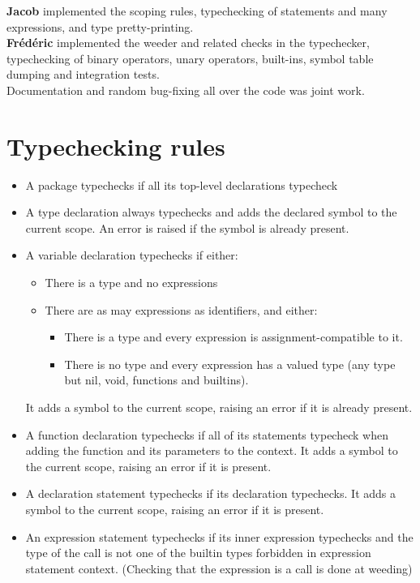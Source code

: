 \documentclass[letterpaper,11pt]{article}
\begin{document}
\textbf{Jacob} implemented the scoping rules, typechecking of statements and many expressions, and type pretty-printing.
\\
\textbf{Fr\'ed\'eric} implemented the weeder and related checks in the typechecker, typechecking of binary operators, unary operators, built-ins, symbol table dumping and integration tests.
\\
Documentation and random bug-fixing all over the code was joint work.

\section{Typechecking rules}

\begin{itemize}
\item A package typechecks if all its top-level declarations typecheck
\item A type declaration always typechecks and adds the declared symbol to the current scope. An error is raised if the symbol is already present.
\item A variable declaration typechecks if either:
	\begin{itemize}
	\item There is a type and no expressions
	\item There are as may expressions as identifiers, and either:
		\begin{itemize}
		\item There is a type and every expression is assignment-compatible to it.
		\item There is no type and every expression has a valued type (any type but nil, void, functions and builtins).
		\end{itemize}
	\end{itemize}
	It adds a symbol to the current scope, raising an error if it is already present.
\item A function declaration typechecks if all of its statements typecheck when adding the function and its parameters to the context. It adds a symbol to the current scope, raising an error if it is present.
\item A declaration statement typechecks if its declaration typechecks. It adds a symbol to the current scope, raising an error if it is present.
\item An expression statement typechecks if its inner expression typechecks and the type of the call is not one of the builtin types forbidden in expression statement context. (Checking that the expression is a call is done at weeding)

\end{itemize}
\end{document}
